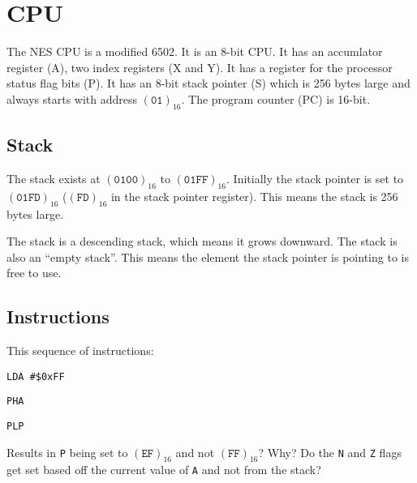 \documentclass[10pt, draft]{book}
\begin{document}
  \begin{titlepage}
  \end{titlepage}

  \tableofcontents

  \chapter{CPU}

  The NES CPU is a modified 6502. It is an 8-bit CPU. It has an accumlator
  register (A), two index registers (X and Y). It has a register for the
  processor status flag bits (P). It has an 8-bit stack pointer (S) which is
  256 bytes large and always starts with address $(\texttt{01})_{16}$. The
  program counter (PC) is 16-bit.

  \section{Stack}

  The stack exists at $(\texttt{0100})_{16}$ to $(\texttt{01FF})_{16}$.
  Initially the stack pointer is set to $(\texttt{01FD})_{16}$
  ($(\texttt{FD})_{16}$ in the stack pointer register). This means the stack is
  256 bytes large.

  The stack is a descending stack, which means it grows downward. The stack is
  also an ``empty stack''. This means the element the stack pointer is pointing
  to is free to use.


  \section{Instructions}

  This sequence of instructions:

  \texttt{LDA \#\$0xFF}

  \texttt{PHA}

  \texttt{PLP}

  \noindent Results in \texttt{P} being set to $(\texttt{EF})_{16}$ and not
  $(\texttt{FF})_{16}$? Why? Do the \texttt{N} and \texttt{Z} flags get set
  based off the current value of \texttt{A} and not from the stack?
\end{document}
